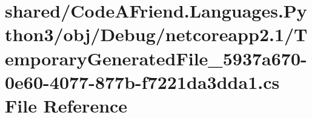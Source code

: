 \hypertarget{shared_2_code_a_friend_8_languages_8_python3_2obj_2_debug_2netcoreapp2_81_2_temporary_generated_590d07cd49c4d32c873d1525946fac58}{}\section{shared/\+Code\+A\+Friend.Languages.\+Python3/obj/\+Debug/netcoreapp2.1/\+Temporary\+Generated\+File\+\_\+5937a670-\/0e60-\/4077-\/877b-\/f7221da3dda1.cs File Reference}
\label{shared_2_code_a_friend_8_languages_8_python3_2obj_2_debug_2netcoreapp2_81_2_temporary_generated_590d07cd49c4d32c873d1525946fac58}
